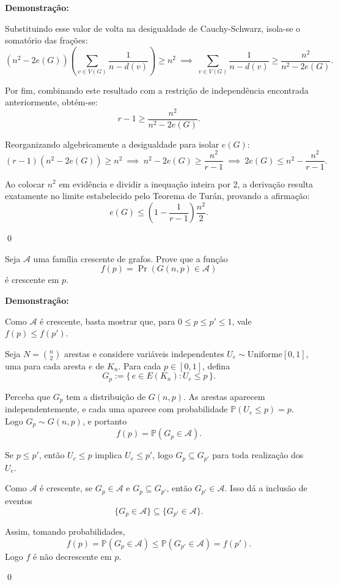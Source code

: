 \documentclass[12pt]{article}
\newenvironment{problem}[2][Exercício]{\begin{trivlist}
\item[\hskip \labelsep {\bfseries #1}\hskip \labelsep {\bfseries #2.}]}{\end{trivlist}}
\newenvironment{sol}
    {\textbf{Demonstração:}\emph{}
    }
    {
    \qed
    }
\begin{document}
\begin{sol}
    Substituindo esse valor de volta na desigualdade de Cauchy-Schwarz, isola-se o somatório das frações:
    \[
        (n^2 - 2e(G)) \left( \sum_{v \in V(G)} \frac{1}{n - d(v)} \right) \ge n^2 \ \implies \ \sum_{v \in V(G)} \frac{1}{n - d(v)} \ge \frac{n^2}{n^2 - 2e(G)}.
    \]
    
    Por fim, combinando este resultado com a restrição de independência encontrada anteriormente, obtém-se:
    \[
        r - 1 \ge \frac{n^2}{n^2 - 2e(G)}.
    \]
    
    Reorganizando algebricamente a desigualdade para isolar $e(G)$:
    \[
        (r - 1)(n^2 - 2e(G)) \ge n^2 \ \implies \ n^2 - 2e(G) \ge \frac{n^2}{r - 1} \ \implies \ 2e(G) \le n^2 - \frac{n^2}{r - 1}.
    \]
    
    Ao colocar $n^2$ em evidência e dividir a inequação inteira por 2, a derivação resulta exatamente no limite estabelecido pelo Teorema de Turán, provando a afirmação:
    \[
        e(G) \le \left( 1 - \frac{1}{r - 1} \right) \frac{n^2}{2}.
    \]
\end{sol}

\begin{problem}{14}
    Seja $\mathcal{A}$ uma família crescente de grafos. Prove que a função
    \[
        f(p) = \Pr(G(n,p) \in \mathcal{A})
    \]
    é crescente em $p$.
\end{problem}
\begin{sol}
Como $\mathcal{A}$ é crescente, basta mostrar que, para $0\le p\le p'\le 1$, vale $f(p)\le f(p')$.

Seja $N=\binom{n}{2}$ arestas e considere variáveis independentes $U_e\sim\text{Uniforme}[0,1]$, uma para cada aresta $e$ de $K_n$. Para cada $p\in[0,1]$, defina
\[
G_p := \{\, e\in E(K_n) : U_e\le p \,\}.
\]


     Perceba que $G_p$ tem a distribuição de $G(n,p)$. As arestas aparecem independentemente, e cada uma aparece com probabilidade $\mathbb{P}(U_e\le p)=p$. Logo $G_p\sim G(n,p)$, e portanto
    \[
    f(p)=\mathbb{P}(G_p\in\mathcal{A}).
    \]

    Se $p\le p'$, então $U_e\le p$ implica $U_e\le p'$, logo $G_p\subseteq G_{p'}$ para toda realização dos $U_e$.

 Como $\mathcal{A}$ é crescente, se $G_p\in\mathcal{A}$ e $G_p\subseteq G_{p'}$, então $G_{p'}\in\mathcal{A}$. Isso dá a inclusão de eventos
    \[
    \{G_p\in\mathcal{A}\}\subseteq\{G_{p'}\in\mathcal{A}\}.
    \]

    Assim, tomando probabilidades,
    \[
    f(p)=\mathbb{P}(G_p\in\mathcal{A})\le\mathbb{P}(G_{p'}\in\mathcal{A})=f(p').
    \]
    Logo $f$ é não decrescente em $p$.
\end{sol}
\end{document}
